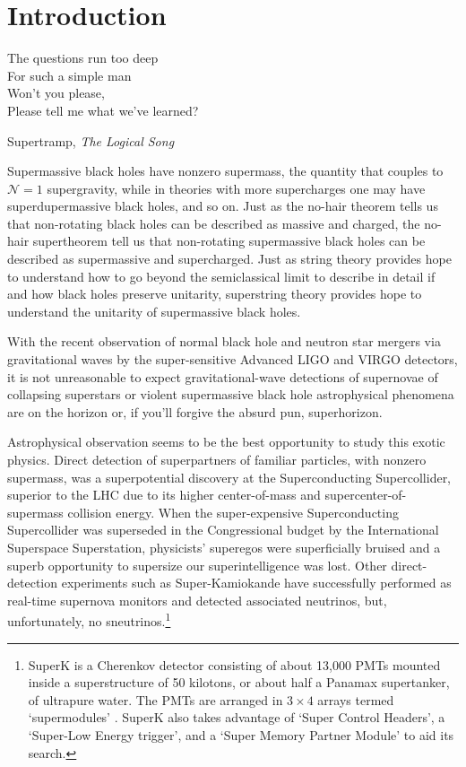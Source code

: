 \section{Introduction}

\epigraph{The questions run too deep\\
For such a simple man\\
Won't you please, \\
Please tell me what we've learned?}{Supertramp, \textit{The Logical Song}}

Supermassive black holes have nonzero supermass, the quantity that couples to $\mathcal{N}=1$ supergravity, while in theories with more supercharges one may have superdupermassive black holes, and so on.
Just as the no-hair theorem tells us that non-rotating black holes can be described as massive and charged, the no-hair supertheorem tell us that non-rotating supermassive black holes can be described as supermassive and supercharged.
Just as string theory provides hope to understand how to go beyond the semiclassical limit to describe in detail if and how black holes preserve unitarity, superstring theory provides hope to understand the unitarity of supermassive black holes.

With the recent observation of normal black hole \cite{Abbott:2016blz,Abbott:2016nmj,Abbott:2017vtc,Abbott:2017oio,Abbott:2017gyy} and neutron star\cite{TheLIGOScientific:2017qsa} mergers via gravitational waves by the super-sensitive Advanced LIGO and VIRGO detectors, it is not unreasonable to expect gravitational-wave detections of supernovae of collapsing superstars or violent supermassive black hole astrophysical phenomena are on the horizon or, if you'll forgive the absurd pun, superhorizon.

Astrophysical observation seems to be the best opportunity to study this exotic physics.
Direct detection of superpartners of familiar particles, with nonzero supermass, was a superpotential discovery at the Superconducting Supercollider, superior to the LHC due to its higher center-of-mass and supercenter-of-supermass collision energy.
When the super-expensive Superconducting Supercollider was superseded in the Congressional budget by the International Superspace Superstation, physicists' superegos were superficially bruised and a superb opportunity to supersize our superintelligence was lost.
Other direct-detection experiments such as Super-Kamiokande have successfully performed as real-time supernova monitors and detected associated neutrinos, but, unfortunately, no sneutrinos.\footnote{ 
SuperK is a Cherenkov detector consisting of about 13,000 PMTs mounted inside a superstructure of 50 kilotons, or about half a Panamax supertanker, of ultrapure water.  The PMTs are arranged in $3\times4$ arrays termed `supermodules' \cite{Fukuda:2002uc}.
SuperK also takes advantage of `Super Control Headers', a `Super-Low Energy trigger', and a `Super Memory Partner Module' to aid its search.
}

